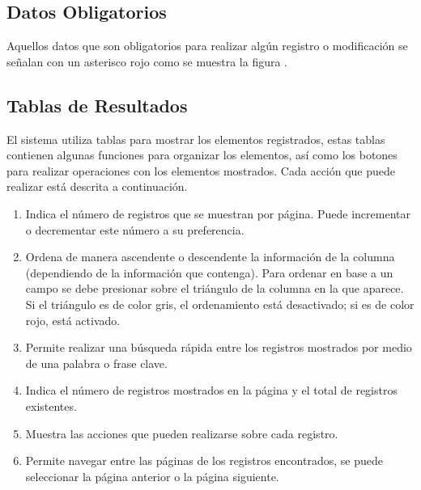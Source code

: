 \subsection{Datos Obligatorios}
Aquellos datos que son obligatorios para realizar algún registro o modificación se señalan con un asterisco rojo como se muestra la figura .

\hypertarget{seccion:tablaResultados}{}
\label{seccion:tablaResultados}
\subsection{Tablas de Resultados}
El sistema utiliza tablas para mostrar los elementos registrados, estas tablas contienen algunas funciones para organizar los elementos, así como los botones para realizar operaciones con los elementos mostrados. Cada acción que puede realizar está descrita a continuación.
\begin{enumerate}	
	\item Indica el número de registros que se muestran por página. Puede incrementar o decrementar este número a su preferencia.
	\item Ordena de manera ascendente o descendente la información de la columna (dependiendo de la información que contenga). Para ordenar en base a un 
			  campo se debe presionar sobre el triángulo de la columna en la que aparece. Si el triángulo es de color gris, el ordenamiento está desactivado; si es de color
			  rojo, está activado.
	\item Permite realizar una búsqueda rápida entre los registros mostrados por medio de una palabra o frase clave.
	\item Indica el número de registros mostrados en la página y el total de registros existentes.
	\item Muestra las acciones que pueden realizarse sobre cada registro.
	\item Permite navegar entre las páginas de los registros encontrados, se puede seleccionar la página anterior o la página siguiente.
\end{enumerate}
{}

\hypertarget{seccion:autocomplete}{}
\label{seccion:autocomplete}

